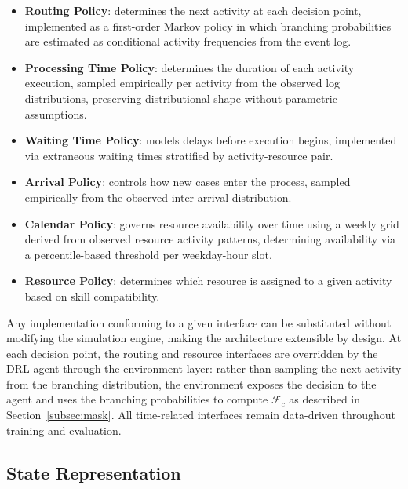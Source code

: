 \documentclass[journal,onecolumn]{IEEEtran}
\begin{document}
\begin{itemize}
    \item \textbf{Routing Policy}: determines the next activity
    at each decision point, implemented as a first-order Markov
    policy in which branching probabilities are estimated as
    conditional activity frequencies from the event log.

    \item \textbf{Processing Time Policy}: determines the
    duration of each activity execution, sampled empirically
    per activity from the observed log distributions, preserving
    distributional shape without parametric assumptions.

    \item \textbf{Waiting Time Policy}: models delays before
    execution begins, implemented via extraneous waiting times
    stratified by activity-resource pair.

    \item \textbf{Arrival Policy}: controls how new cases enter
    the process, sampled empirically from the observed
    inter-arrival distribution.

    \item \textbf{Calendar Policy}: governs resource availability
    over time using a weekly grid derived from observed resource
    activity patterns, determining availability via a
    percentile-based threshold per weekday-hour slot.

    \item \textbf{Resource Policy}: determines which resource is
    assigned to a given activity based on skill compatibility.
\end{itemize}

Any implementation conforming to a given interface can be
substituted without modifying the simulation engine, making the
architecture extensible by design. At each decision point, the
routing and resource interfaces are overridden by the DRL agent
through the environment layer: rather than sampling the next
activity from the branching distribution, the environment exposes
the decision to the agent and uses the branching probabilities to
compute $\mathcal{F}_c$ as described in
Section~\ref{subsec:mask}. All time-related interfaces remain
data-driven throughout training and evaluation.

\subsection{State Representation}
\label{subsec:state_representation}
\end{document}
